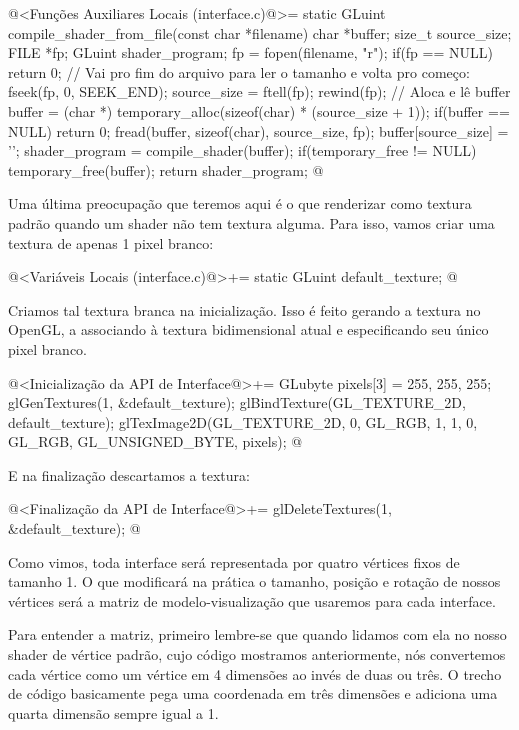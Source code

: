 \iniciocodigo
@<Funções Auxiliares Locais (interface.c)@>=
static GLuint compile_shader_from_file(const char *filename){
  char *buffer;
  size_t source_size;
  FILE *fp;
  GLuint shader_program;
  fp = fopen(filename, "r");
  if(fp == NULL)  return 0;
  // Vai pro fim do arquivo para ler o tamanho e volta pro começo:
  fseek(fp, 0, SEEK_END);
  source_size = ftell(fp);
  rewind(fp);
  // Aloca e lê buffer
  buffer = (char *) temporary_alloc(sizeof(char) * (source_size + 1));
  if(buffer == NULL) return 0;
  fread(buffer, sizeof(char), source_size, fp);
  buffer[source_size] = '\0';
  shader_program = compile_shader(buffer);
  if(temporary_free != NULL) temporary_free(buffer);
  return shader_program;
}
@
\fimcodigo


Uma última preocupação que teremos aqui é o que renderizar como textura
padrão quando um shader não tem textura alguma. Para isso, vamos criar
uma textura de apenas 1 pixel branco:

\iniciocodigo
@<Variáveis Locais (interface.c)@>+=
static GLuint default_texture;
@
\fimcodigo

Criamos tal textura branca na inicialização. Isso é feito gerando a
textura no OpenGL, a associando à textura bidimensional atual e
especificando seu único pixel branco.

\iniciocodigo
@<Inicialização da API de Interface@>+=
{
  GLubyte pixels[3] = {255, 255, 255};
  glGenTextures(1, &default_texture);
  glBindTexture(GL_TEXTURE_2D, default_texture);
  glTexImage2D(GL_TEXTURE_2D, 0, GL_RGB, 1, 1, 0, GL_RGB, GL_UNSIGNED_BYTE,
               pixels);
}
@
\fimcodigo

E na finalização descartamos a textura:

\iniciocodigo
@<Finalização da API de Interface@>+=
glDeleteTextures(1, &default_texture);
@
\fimcodigo


Como vimos, toda interface será representada por quatro vértices fixos
de tamanho 1. O que modificará na prática o tamanho, posição e rotação
de nossos vértices será a matriz de modelo-visualização que usaremos
para cada interface.

Para entender a matriz, primeiro lembre-se que quando lidamos com ela
no nosso shader de vértice padrão, cujo código mostramos
anteriormente, nós convertemos cada vértice como um vértice em 4
dimensões ao invés de duas ou três. O trecho de código
 basicamente pega uma
coordenada em três dimensões e adiciona uma quarta dimensão sempre
igual a 1.

